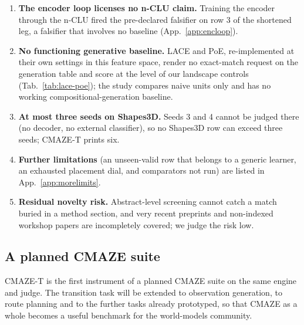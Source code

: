 \documentclass{article} %
\begin{document}
\begin{enumerate}
  learning rate and the longer epoch count of its grids, and the MLP at seed 0 still gains 1.47 tuples %
  per held-out combination from ten to thirty times its steps (Sec.~\ref{sec:shapes-t7}).
\item \textbf{The encoder loop licenses no n-CLU claim.} Training the encoder through the n-CLU
  fired the pre-declared falsifier on row 3 of the shortened leg, a falsifier that involves no baseline %
  (App.~\ref{app:encloop}).
\item \textbf{No functioning generative baseline.} LACE and PoE, re-implemented at their own settings
  in this feature space, render no exact-match request on the generation table and score at the level
  of our landscape controls (Tab.~\ref{tab:lace-poe}); the study compares naive units only and has no
  working compositional-generation baseline.
\item \textbf{At most three seeds on Shapes3D.} Seeds 3 and 4 cannot be judged there (no decoder, no
  external classifier), so no Shapes3D row can exceed three seeds; CMAZE-T prints six.
\item \textbf{Further limitations} (an unseen-valid row that belongs to a generic learner, an
  exhausted placement dial, and comparators not run) are listed in App.~\ref{app:morelimits}.
\item \textbf{Residual novelty risk.} Abstract-level screening cannot catch a match buried in a
  method section, and very recent preprints and non-indexed workshop papers are incompletely
  covered; we judge the risk low. %
\end{enumerate}

\subsection{A planned CMAZE suite}

CMAZE-T is the first instrument of a planned CMAZE suite on the same
engine and judge. The transition task will be extended to observation generation, to route planning
and to the further tasks already prototyped, so that CMAZE as a whole becomes a useful benchmark for
the world-models community.
\end{document}
